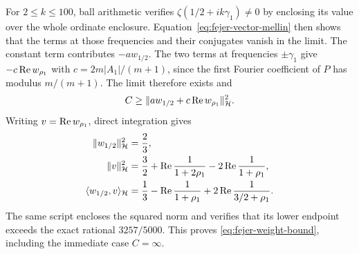 For \(2\le k\le100\), ball arithmetic verifies
\(\zeta(1/2+ik\gamma_1)\ne0\) by enclosing its value over the
whole ordinate enclosure. Equation~\eqref{eq:fejer-vector-mellin}
then shows that the terms at those frequencies and their
conjugates vanish in the limit. The constant term contributes
\(-a w_{1/2}\). The two terms at frequencies \(\pm\gamma_1\)
give \(-c\operatorname{Re} w_{\rho_1}\) with
\(c=2m|A_1|/(m+1)\), since the first Fourier coefficient of
\(P\) has modulus \(m/(m+1)\). The limit therefore exists and
\[
 C\ge \|a w_{1/2}+c\operatorname{Re} w_{\rho_1}\|_{\mathcal H}^2.
\]
Writing \(v=\operatorname{Re} w_{\rho_1}\), direct integration gives
\begin{align*}
 \|w_{1/2}\|_{\mathcal H}^2&=\frac23,\\
 \|v\|_{\mathcal H}^2&=\frac32+\operatorname{Re}\frac1{1+2\rho_1}
                       -2\operatorname{Re}\frac1{1+\rho_1},\\
 \langle w_{1/2},v\rangle_{\mathcal H}
    &=\frac13-\operatorname{Re}\frac1{1+\rho_1}+2\operatorname{Re}\frac1{3/2+\rho_1}.
\end{align*}
The same script encloses the squared norm and verifies that
its lower endpoint exceeds the exact rational \(3257/5000\).
This proves \eqref{eq:fejer-weight-bound}, including the
immediate case \(C=\infty\).
